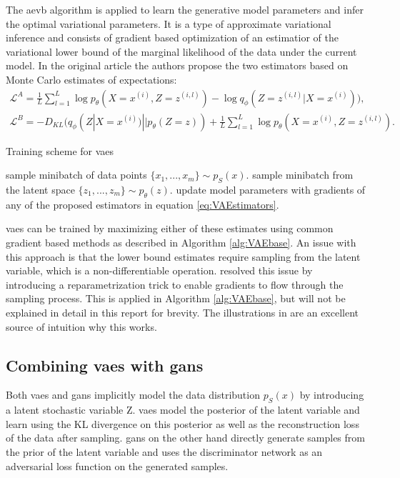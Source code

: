 The \acrshort{aevb} algorithm is applied to learn the generative model parameters and infer the optimal variational parameters. It is a type of approximate variational inference and consists of gradient based optimization of an estimatior of the variational lower bound of the marginal likelihood of the data under the current model. In the original article the authors propose the two estimators based on Monte Carlo estimates of expectations:
\begin{equation}
    \label{eq:VAEstimators}
    \begin{aligned}
        \mathcal{L}^A = \frac{1}{L}\sum_{l=1}^L \log p_\theta (X=x^{(i)},Z=z^{(i, l)}) - \log q_\phi (Z=z^{(i, l)} | X=x^{(i)}) ), \\
        \mathcal{L}^B = - D_{KL}(q_\phi (Z | X=x^{(i)}) || p_\theta(Z=z)) + \frac{1}{L}\sum_{l=1}^L \log p_\theta (X=x^{(i)},Z=z^{(i, l)}).
    \end{aligned}
\end{equation}

\begin{algorithm}
    \caption{Training scheme for \acrlong{vaes}}
    \label{alg:VAEbase}
    \begin{algorithmic}[1]
        \STATE sample minibatch of data points $\{x_{1}, ..., x_{m}\} \sim p_S(x)$.
        \STATE sample minibatch from the latent space $\{z_1, ..., z_m\} \sim p_\theta(z)$.
        \STATE update model parameters with gradients of any of the proposed estimators in equation \ref{eq:VAEstimators}.
        \ENDFOR
    \end{algorithmic}
\end{algorithm}

\acrshort{vaes} can be trained by maximizing either of these estimates using common gradient based methods as described in Algorithm \ref{alg:VAEbase}. An issue with this approach is that the lower bound estimates require sampling from the latent variable, which is a non-differentiable operation. \textcite{kingma2013auto} resolved this issue by introducing a reparametrization trick to enable gradients to flow through the sampling process. This is applied in Algorithm \ref{alg:VAEbase}, but will not be explained in detail in this report for brevity. The illustrations in \parencite{doersch2016tutorial} are an excellent source of intuition why this works.

\subsection{Combining \acrshort{vaes} with \acrshort{gans}}
Both \acrshort{vaes} and \acrshort{gans} implicitly model the data distribution $p_S(x)$ by introducing a latent stochastic variable Z. \acrshort{vaes} model the posterior of the latent variable and learn using the KL divergence on this posterior as well as the reconstruction loss of the data after sampling. \acrshort{gans} on the other hand directly generate samples from the prior of the latent variable and uses the discriminator network as an adversarial loss function on the generated samples. 

